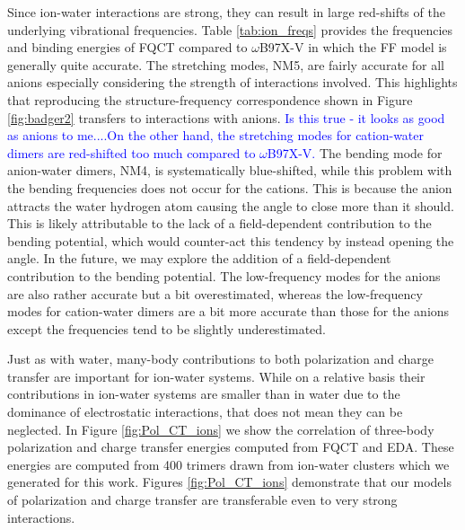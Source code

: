 \documentclass[journal=jctcce,manuscript=article]{achemso}
\begin{document}
Since ion-water interactions are strong, they can result in large red-shifts of the underlying vibrational frequencies. Table \ref{tab:ion_freqs} provides the frequencies and binding energies of FQCT compared to $\omega$B97X-V in which the FF model is generally quite accurate. The  stretching modes, NM5, are fairly accurate for all anions especially considering the strength of interactions involved. This highlights that reproducing the structure-frequency correspondence shown in Figure \ref{fig:badger2} transfers to interactions with anions. \textcolor{blue}{Is this true - it looks as good as anions to me....On the other hand, the  stretching modes for cation-water dimers are red-shifted too much compared to $\omega$B97X-V.} The bending mode for anion-water dimers, NM4, is systematically blue-shifted, while this problem with the bending frequencies does not occur for the cations. This is because the anion attracts the water hydrogen atom causing the  angle to close more than it should. This is likely attributable to the lack of a field-dependent contribution to the bending potential, which would counter-act this tendency by instead opening the  angle. In the future, we may explore the addition of a field-dependent contribution to the bending potential. The low-frequency modes for the anions are also rather accurate but a bit overestimated, whereas the low-frequency modes for cation-water dimers are a bit more accurate than those for the anions except the frequencies tend to be slightly underestimated.

Just as with water, many-body contributions to both polarization and charge transfer are important for ion-water systems. While on a relative basis their contributions in ion-water systems are smaller than in water due to the dominance of electrostatic interactions, that does not mean they can be neglected. In Figure \ref{fig:Pol_CT_ions} we show the correlation of three-body polarization and charge transfer energies computed from FQCT and EDA. These energies are computed from 400 trimers drawn from ion-water clusters which we generated for this work. Figures \ref{fig:Pol_CT_ions} demonstrate that our models of polarization and charge transfer are transferable even to very strong interactions. 
\end{document}
